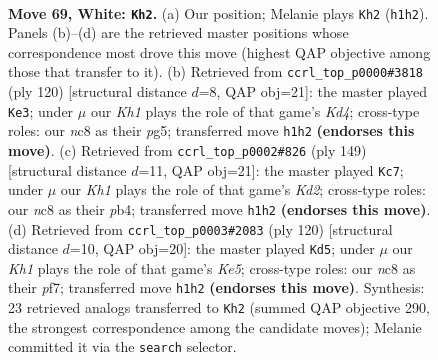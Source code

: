 \documentclass[11pt]{article}
\begin{document}
\clearpage

\begin{figure}[p]\centering
\begin{subfigure}{0.46\textwidth}\centering
\resizebox{\linewidth}{!}{%
\newchessgame
\chessboard[
  setfen={2nk4/8/R7/8/p5rp/P7/8/7K w - - 0 69},
  showmover=false,
  pgfstyle=straightmove, color=movearrow, markmove={h1-h2}
]}
\caption{}
\end{subfigure}\hfill
\begin{subfigure}{0.46\textwidth}\centering
\resizebox{\linewidth}{!}{%
\newchessgame
\chessboard[
  setfen={R7/8/p1r5/P4kp1/3K4/8/5P2/8 w - - 0 61},
  showmover=false,
  pgfstyle=straightmove, color=movearrow, markmove={d4-e3}
]}
\caption{}
\end{subfigure}
\\[4pt]
\begin{subfigure}{0.46\textwidth}\centering
\resizebox{\linewidth}{!}{%
\newchessgame
\chessboard[
  setfen={7R/3k4/8/1K4p1/1P6/5r1P/8/8 b - - 0 75},
  showmover=false,
  pgfstyle=straightmove, color=movearrow, markmove={d7-c7}
]}
\caption{}
\end{subfigure}\hfill
\begin{subfigure}{0.46\textwidth}\centering
\resizebox{\linewidth}{!}{%
\newchessgame
\chessboard[
  setfen={8/5pk1/8/R1p1K3/8/2r5/6P1/8 w - - 2 61},
  showmover=false,
  pgfstyle=straightmove, color=movearrow, markmove={e5-d5}
]}
\caption{}
\end{subfigure}
\caption{\textbf{Move 69, White: \texttt{Kh2}.} (a) Our position; Melanie plays \texttt{Kh2} (\texttt{h1h2}). Panels (b)--(d) are the retrieved master positions whose correspondence most drove this move (highest QAP objective among those that transfer to it). (b) Retrieved from \texttt{ccrl\_top\_p0000\#3818} (ply 120) [structural distance $d$=8, QAP obj=21]: the master played \texttt{Ke3}; under $\mu$ our \emph{Kh1} plays the role of that game's \emph{Kd4}; cross-type roles: our \emph{n}c8 as their \emph{p}g5; transferred move \texttt{h1h2} \textbf{(endorses this move)}. (c) Retrieved from \texttt{ccrl\_top\_p0002\#826} (ply 149) [structural distance $d$=11, QAP obj=21]: the master played \texttt{Kc7}; under $\mu$ our \emph{Kh1} plays the role of that game's \emph{Kd2}; cross-type roles: our \emph{n}c8 as their \emph{p}b4; transferred move \texttt{h1h2} \textbf{(endorses this move)}. (d) Retrieved from \texttt{ccrl\_top\_p0003\#2083} (ply 120) [structural distance $d$=10, QAP obj=20]: the master played \texttt{Kd5}; under $\mu$ our \emph{Kh1} plays the role of that game's \emph{Ke5}; cross-type roles: our \emph{n}c8 as their \emph{p}f7; transferred move \texttt{h1h2} \textbf{(endorses this move)}. Synthesis: 23 retrieved analogs transferred to \texttt{Kh2} (summed QAP objective 290, the strongest correspondence among the candidate moves); Melanie committed it via the \texttt{search} selector.}
\label{fig:thought-m136}
\end{figure}
\end{document}
